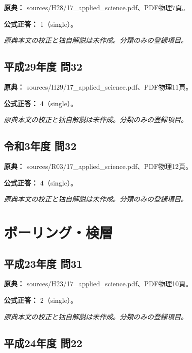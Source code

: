 \noindent\textbf{原典：} sources/H28/17\_applied\_science.pdf、PDF物理7頁。

\textbf{公式正答：} 1（single）。

\par\textit{原典本文の校正と独自解説は未作成。分類のみの登録項目。}

\subsection{平成29年度 問32}
\label{q:h29-reg-applied-32}

\noindent\textbf{原典：} sources/H29/17\_applied\_science.pdf、PDF物理11頁。

\textbf{公式正答：} 4（single）。

\par\textit{原典本文の校正と独自解説は未作成。分類のみの登録項目。}

\subsection{令和3年度 問32}
\label{q:r03-reg-applied-32}

\noindent\textbf{原典：} sources/R03/17\_applied\_science.pdf、PDF物理12頁。

\textbf{公式正答：} 4（single）。

\par\textit{原典本文の校正と独自解説は未作成。分類のみの登録項目。}

\section{ボーリング・検層}

\subsection{平成23年度 問31}
\label{q:h23-reg-applied-31}

\noindent\textbf{原典：} sources/H23/17\_applied\_science.pdf、PDF物理10頁。

\textbf{公式正答：} 2（single）。

\par\textit{原典本文の校正と独自解説は未作成。分類のみの登録項目。}

\subsection{平成24年度 問22}
\label{q:h24-reg-applied-22}

